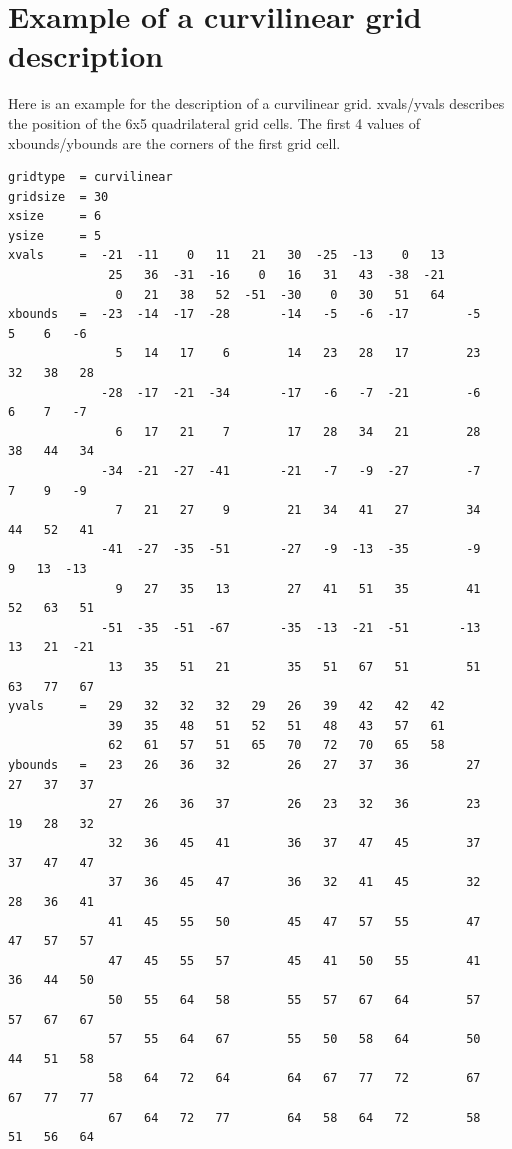 \section{Example of a curvilinear grid description}
Here is an example for the {\CDO} description of a curvilinear grid.
xvals/yvals describes the position of the 6x5 quadrilateral grid cells.
The first 4 values of xbounds/ybounds are the corners of the first grid cell.
\begin{lstlisting}[frame=single, backgroundcolor=\color{zebg}, basicstyle=\footnotesize]
gridtype  = curvilinear
gridsize  = 30
xsize     = 6
ysize     = 5
xvals     =  -21  -11    0   11   21   30  -25  -13    0   13
              25   36  -31  -16    0   16   31   43  -38  -21
               0   21   38   52  -51  -30    0   30   51   64
xbounds   =  -23  -14  -17  -28       -14   -5   -6  -17        -5    5    6   -6
               5   14   17    6        14   23   28   17        23   32   38   28
             -28  -17  -21  -34       -17   -6   -7  -21        -6    6    7   -7
               6   17   21    7        17   28   34   21        28   38   44   34
             -34  -21  -27  -41       -21   -7   -9  -27        -7    7    9   -9
               7   21   27    9        21   34   41   27        34   44   52   41
             -41  -27  -35  -51       -27   -9  -13  -35        -9    9   13  -13
               9   27   35   13        27   41   51   35        41   52   63   51
             -51  -35  -51  -67       -35  -13  -21  -51       -13   13   21  -21
              13   35   51   21        35   51   67   51        51   63   77   67
yvals     =   29   32   32   32   29   26   39   42   42   42
              39   35   48   51   52   51   48   43   57   61
              62   61   57   51   65   70   72   70   65   58
ybounds   =   23   26   36   32        26   27   37   36        27   27   37   37
              27   26   36   37        26   23   32   36        23   19   28   32
              32   36   45   41        36   37   47   45        37   37   47   47
              37   36   45   47        36   32   41   45        32   28   36   41
              41   45   55   50        45   47   57   55        47   47   57   57
              47   45   55   57        45   41   50   55        41   36   44   50
              50   55   64   58        55   57   67   64        57   57   67   67
              57   55   64   67        55   50   58   64        50   44   51   58
              58   64   72   64        64   67   77   72        67   67   77   77
              67   64   72   77        64   58   64   72        58   51   56   64
\end{lstlisting}

